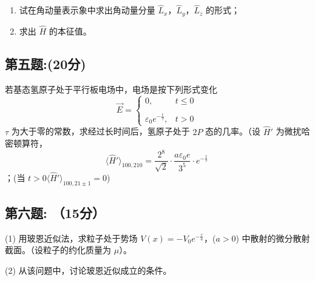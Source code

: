 \begin{enumerate}
    \item 试在角动量表示象中求出角动量分量 $\hat{L}_x$，$\hat{L}_y$，$\hat{L}_z$ 的形式；
    \item 求出 $\hat{H}$ 的本征值。
\end{enumerate}
\subsection{第五题:(20分)}
若基态氢原子处于平行板电场中，电场是按下列形式变化
$$\vec{E} = \begin{cases} 0, & t \leq 0 \\\\\varepsilon_0 e^{-\frac{t}{\tau}}, & t > 0\end{cases}~$$
$\tau$ 为大于零的常数，求经过长时间后，氢原子处于 $2P$ 态的几率。（设 $\hat{H}'$ 为微扰哈密顿算符，
$$\langle \hat{H}' \rangle_{100,210} = \frac{2^8}{\sqrt{2}} \cdot \frac{a\varepsilon_0 e}{3^5}\cdot e^{-\frac{t}{\tau}}~$$；(当  $t > 0 \langle \hat{H}' \rangle_{100,21\pm 1} = 0 $)
\subsection{第六题: （15分）}
(1) 用玻恩近似法，求粒子处于势场 $V(x) = -V_0 e^{-\frac{r}{a}}$，($a > 0$) 中散射的微分散射截面。（设粒子的约化质量为 $\mu$）。

(2) 从该问题中，讨论玻恩近似成立的条件。